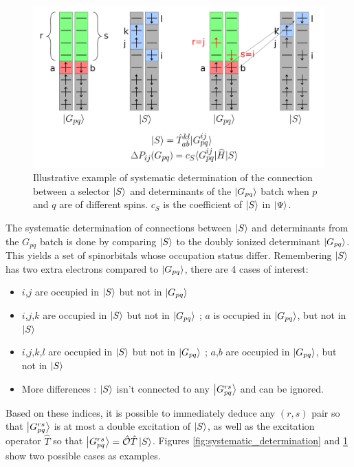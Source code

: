 \documentclass[./thesis.tex]{subfiles}
\begin{document}
\begin{figure}[h!]
        \begin{center}
                \includegraphics[width=0.90\columnwidth]{figures/cipsi/systematic_determination2}       
        \end{center}
        \caption{Illustrative example of systematic determination of the connection between a selector $\ket S$ and determinants of the $\ket {G_{pq}}$ batch when $p$ and $q$ are of different spins. $c_S$ is the coefficient of $\ket S$ in $\ket \Psi$.}
        \label{fig:systematic_determination2}
\end{figure}


The systematic determination of connections between $\ket S$ and determinants from the ${G_{pq}}$ batch is done by comparing $\ket S$ to the doubly ionized determinant $\ket {G_{pq}}$. This yields a set of spinorbitals whose occupation status differ. Remembering $\ket S$ has two extra electrons compared to $\ket {G_{pq}}$, there are 4 cases of interest:
\begin{itemize}

\item
$i$,$j$ are occupied in $\ket S$ but not in $\ket {G_{pq}}$
\item
$i$,$j$,$k$ are occupied in $\ket S$ but not in $\ket {G_{pq}}$ ; $a$ is occupied in $\ket {G_{pq}}$, but not in $\ket S$
\item
$i$,$j$,$k$,$l$ are occupied in $\ket S$ but not in $\ket {G_{pq}}$ ; $a$,$b$ are occupied in $\ket {G_{pq}}$, but not in $\ket S$
\item
More differences : $\ket S$ isn't connected to any $\ket {G_{pq}^{rs}}$ and can be ignored. 

\end{itemize}

Based on these indices, it is possible to immediately deduce any $(r,s)$ pair so that $\ket {G_{pq}^{rs}}$ is at most a double excitation of $\ket S$, as well as the excitation operator $\hat{T}$ so that $\ket {G_{pq}^{rs}}={\hat{\mathcal{O}}} \hat{T} \ket S$. Figures \ref{fig:systematic_determination} and \ref{fig:systematic_determination2} show two possible cases as examples.
\end{document}
